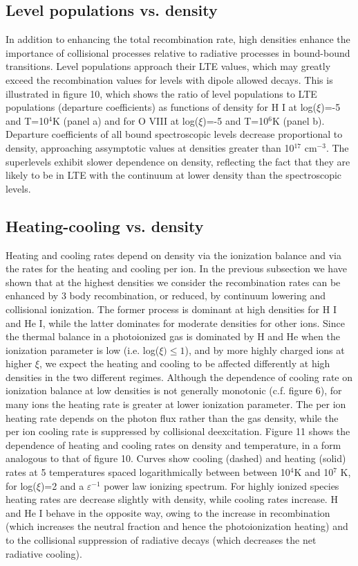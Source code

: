 \subsection{Level populations vs. density}

In addition to enhancing the total recombination rate, 
high densities enhance the importance of collisional processes relative to 
radiative processes in bound-bound transitions.  Level populations 
approach their LTE values, which may greatly exceed the recombination 
values for levels with dipole allowed decays.
This is illustrated in figure 10, which shows the ratio of level populations to 
LTE populations (departure coefficients) as functions 
of density for H I at log($\xi$)=-5  and T=10$^4$K (panel a) and for O VIII 
at log($\xi$)=-5  and T=10$^6$K (panel b).  Departure coefficients of all bound spectroscopic levels 
decrease proportional to density, approaching assymptotic values at densities
greater than 10$^{17}$ cm$^{-3}$.  The superlevels exhibit slower dependence on 
density, reflecting the fact that they are likely to be in LTE with the continuum 
at lower density than the spectroscopic levels. 

\subsection{Heating-cooling vs. density}

Heating and cooling rates depend on density via the ionization balance and 
via the rates for the heating and cooling per ion.  
In the previous subsection we have shown that at the highest densities we 
consider the recombination rates can be enhanced by 3 body recombination, or 
reduced, by continuum lowering and collisional ionization.  The former
process is dominant at high densities for H I and He I, while the latter 
dominates for moderate densities for other ions.  Since the thermal 
balance in a photoionized gas is dominated by H and He when the ionization 
parameter is low (i.e. log($\xi) \leq 1$), and by more highly charged ions 
at higher $\xi$, we expect the heating and cooling to be affected differently 
at high densities in the two different regimes.   Although the 
dependence of cooling rate on ionization balance at low densities 
is not generally monotonic (c.f. figure 6), for many ions the heating rate 
is greater at lower ionization parameter.   The per ion heating rate 
depends on the photon flux rather than the gas density, while the 
per ion cooling rate is suppressed by collisional deexcitation.
Figure 11 shows the dependence of heating and cooling rates on density and 
temperature, in a form analogous to that of figure 10.  Curves show 
cooling (dashed) and heating (solid) rates at 5 temperatures spaced 
logarithmically between between 10$^4$K and 10$^7$ K, for log($\xi$)=2
and a $\varepsilon^{-1}$ power law ionizing spectrum.  For highly ionized species
heating rates are decrease slightly with density, while cooling rates increase.
H and He I behave in the opposite way, owing to the increase in recombination
(which increases the neutral fraction and hence the photoionization heating)
and to the collisional suppression of radiative decays (which 
decreases the net radiative cooling).



